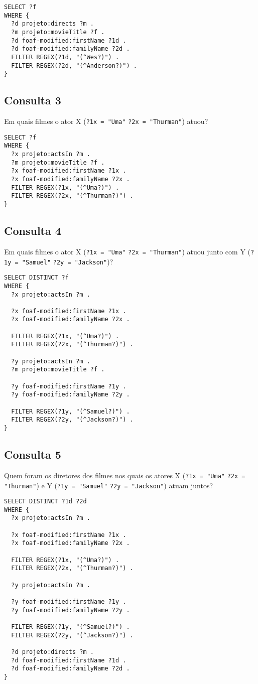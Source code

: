 \documentclass{article}
\newcommand{\code}[1]{\lstinline[mathescape=true]{#1}}
\begin{document}
\begin{lstlisting}[basicstyle=\ttfamily,frame=single]
SELECT ?f
WHERE {
  ?d projeto:directs ?m .
  ?m projeto:movieTitle ?f .
  ?d foaf-modified:firstName ?1d .
  ?d foaf-modified:familyName ?2d .
  FILTER REGEX(?1d, "(^Wes?)") .
  FILTER REGEX(?2d, "(^Anderson?)") .
}
\end{lstlisting}
\subsection{Consulta 3}
Em quais filmes o ator X (\code{?1x = "Uma"} \code{?2x = "Thurman"}) atuou?

\begin{lstlisting}[basicstyle=\ttfamily,frame=single]
SELECT ?f
WHERE {
  ?x projeto:actsIn ?m .
  ?m projeto:movieTitle ?f .
  ?x foaf-modified:firstName ?1x .
  ?x foaf-modified:familyName ?2x .
  FILTER REGEX(?1x, "(^Uma?)") .
  FILTER REGEX(?2x, "(^Thurman?)") .
}
\end{lstlisting}
\subsection{Consulta 4}
Em quais filmes o ator X (\code{?1x = "Uma"} \code{?2x = "Thurman"}) atuou junto com Y (\code{?1y = "Samuel"} \code{?2y = "Jackson"})?

\begin{lstlisting}[basicstyle=\ttfamily,frame=single]
SELECT DISTINCT ?f
WHERE {
  ?x projeto:actsIn ?m .

  ?x foaf-modified:firstName ?1x .
  ?x foaf-modified:familyName ?2x .

  FILTER REGEX(?1x, "(^Uma?)") .
  FILTER REGEX(?2x, "(^Thurman?)") .

  ?y projeto:actsIn ?m .
  ?m projeto:movieTitle ?f .

  ?y foaf-modified:firstName ?1y .
  ?y foaf-modified:familyName ?2y .

  FILTER REGEX(?1y, "(^Samuel?)") .
  FILTER REGEX(?2y, "(^Jackson?)") .
}
\end{lstlisting}
\subsection{Consulta 5}
Quem foram os diretores dos filmes nos quais os atores X (\code{?1x = "Uma"} \code{?2x = "Thurman"}) e Y (\code{?1y = "Samuel"} \code{?2y = "Jackson"}) atuam juntos?

\begin{lstlisting}[basicstyle=\ttfamily,frame=single]
SELECT DISTINCT ?1d ?2d
WHERE {
  ?x projeto:actsIn ?m .

  ?x foaf-modified:firstName ?1x .
  ?x foaf-modified:familyName ?2x .

  FILTER REGEX(?1x, "(^Uma?)") .
  FILTER REGEX(?2x, "(^Thurman?)") .

  ?y projeto:actsIn ?m .

  ?y foaf-modified:firstName ?1y .
  ?y foaf-modified:familyName ?2y .

  FILTER REGEX(?1y, "(^Samuel?)") .
  FILTER REGEX(?2y, "(^Jackson?)") .

  ?d projeto:directs ?m .
  ?d foaf-modified:firstName ?1d .
  ?d foaf-modified:familyName ?2d .
}
\end{lstlisting}
\end{document}
